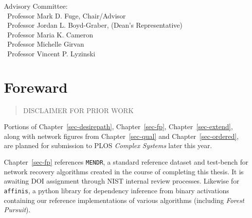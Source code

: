 \documentclass[%
	12pt,
		oneside,
		letterpaper
]{book}
\begin{document}
\vspace{7.5em}

\noindent Advisory Committee: \\
\hbox{\ }\hspace{.5in}Professor Mark D. Fuge, Chair/Advisor \\
\hbox{\ }\hspace{.5in}Professor Jordan L. Boyd-Graber, (Dean's Representative) \\
\hbox{\ }\hspace{.5in}Professor Maria K. Cameron \\
\hbox{\ }\hspace{.5in}Professor Michelle Girvan \\
\hbox{\ }\hspace{.5in}Professor Vincent P. Lyzinski \\
 \doublespacing


% 

% 
{}




\chapter*{Foreward}\label{foreward}



\begin{quote}
DISCLAIMER FOR PRIOR WORK
\end{quote}

Portions of Chapter~\ref{sec-desirepath}, Chapter~\ref{sec-fp}, Chapter~\ref{sec-extend}, along with network figures from Chapter~\ref{sec-qual} and Chapter~\ref{sec-ordered}, are planned for submission to PLOS \emph{Complex Systems} later this year.

Chapter~\ref{sec-fp} references \texttt{MENDR}, a standard reference dataset and test-bench for network recovery algorithms created in the course of completing this thesis.
It is awaiting DOI assignment through NIST internal review processes.
Likewise for \texttt{affinis}, a python library for dependency inference from binary activations containing our reference implementations of various algorithms (including \emph{Forest Pursuit}).
\end{document}
